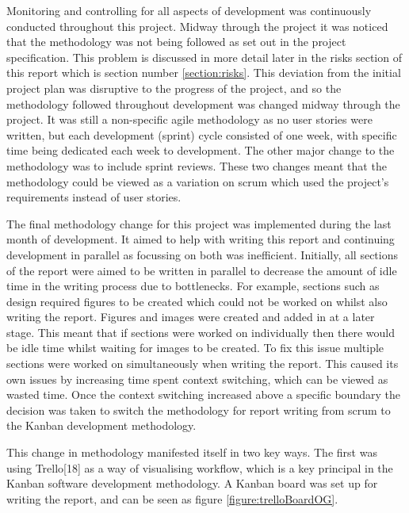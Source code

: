 \documentclass{article}
\begin{document}
Monitoring and controlling for all aspects of development was continuously conducted throughout this project. Midway through the project it was noticed that the methodology was not being followed as set out in the project specification. This problem is discussed in more detail later in the risks section of this report which is section number \ref{section:risks}. This deviation from the initial project plan was disruptive to the progress of the project, and so the methodology followed throughout development was changed midway through the project. It was still a non-specific agile methodology as no user stories were written, but each development (sprint) cycle consisted of one week, with specific time being dedicated each week to development. The other major change to the methodology was to include sprint reviews. These two changes meant that the methodology could be viewed as a variation on scrum which used the project's requirements instead of user stories. \par

The final methodology change for this project was implemented during the last month of development. It aimed to help with writing this report and continuing development in parallel as focussing on both was inefficient. Initially, all sections of the report were aimed to be written in parallel to decrease the amount of idle time in the writing process due to bottlenecks. For example, sections such as design required figures to be created which could not be worked on whilst also writing the report. Figures and images were created and added in at a later stage. This meant that if sections were worked on individually then there would be idle time whilst waiting for images to be created. To fix this issue multiple sections were worked on simultaneously when writing the report. This caused its own issues by increasing time spent context switching, which can be viewed as wasted time. Once the context switching increased above a specific boundary the decision was taken to switch the methodology for report writing from scrum to the Kanban development methodology. \par

This change in methodology manifested itself in two key ways. The first was using Trello[18] as a way of visualising workflow, which is a key principal in the Kanban software development methodology. A Kanban board was set up for writing the report, and can be seen as figure \ref{figure:trelloBoardOG}. \par
\end{document}

